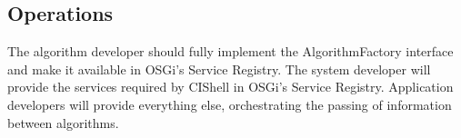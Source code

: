 \subsection{Operations}

The algorithm developer should fully implement the AlgorithmFactory interface and
make it available in OSGi's Service Registry. The system developer will provide
the services required by CIShell in OSGi's Service Registry. Application
developers will provide everything else, orchestrating the passing of information
between algorithms.
